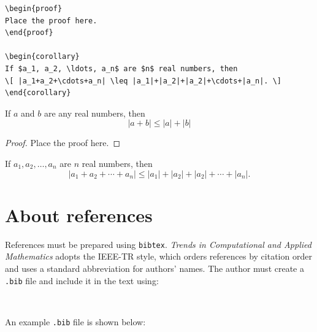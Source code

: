 \documentclass[english]{TCAM} %
\begin{document}
\begin{itemize}
\begin{framed}
\begin{verbatim}
\begin{proof}
Place the proof here.
\end{proof}

\begin{corollary}
If $a_1, a_2, \ldots, a_n$ are $n$ real numbers, then
\[ |a_1+a_2+\cdots+a_n| \leq |a_1|+|a_2|+|a_2|+\cdots+|a_n|. \]
\end{corollary}
\end{verbatim}
\end{framed}


\begin{framed}
\begin{theorem}
\label{teoDT}
If $a$ and $b$ are any real numbers, then
\[ |a+b| \leq |a| + |b| \]
\end{theorem}

\begin{proof}
Place the proof here.
\end{proof}

\begin{corollary}
If $a_1, a_2, \ldots, a_n$ are $n$ real numbers, then
\[ |a_1+a_2+\cdots+a_n| \leq |a_1|+|a_2|+|a_2|+\cdots+|a_n|. \]
\end{corollary}
\end{framed}

\end{itemize}


\section{About references}

References must be prepared using \texttt{bibtex}. \textit{Trends in Computational and Applied Mathematics} adopts the IEEE-TR style, which orders references by citation order and uses a standard abbreviation for authors' names. The author must create a \texttt{.bib} file and include it in the text using:

\begin{framed}
\begin{verbatim}


\end{verbatim}
\end{framed}

An example \texttt{.bib} file is shown below:

\newpage
\end{document}
